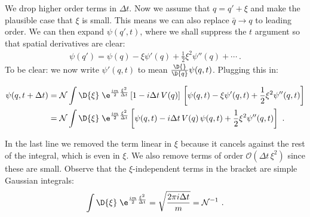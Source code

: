 We drop higher order terms in $\Delta t$.
Now we assume that $q= q' + \xi$ and make the plausible case that $\xi$ is small. This means we can also replace $\bar q \to q$ to leading order.
We can then expand $\psi(q',t)$, where we shall suppress the $t$ argument so that spatial derivatives are clear:
\begin{align}
    \psi(q') = \psi(q) -\xi \psi'(q) + \frac{1}{2}\xi^2 \psi''(q) + \cdots \ .
\end{align}
To be clear: we now write $\psi'(q,t)$ to mean $\frac{\D{}}{\D{q}}\psi(q,t)$.
Plugging this in:
\begin{wide}
\begin{align}
    \psi(q,t+\Delta t) &= 
    \mathcal N\int \D{\xi}\; 
    \e^{\frac{im}{2}\frac{\xi^2}{\Delta t}} 
    \left[1 - i\Delta t \, V(q)\right]\,
    \left[\psi(q,t) -\xi \psi'(q,t) + \frac{1}{2}\xi^2 \psi''(q,t)\right] 
    \\
    &= 
    \mathcal N\int \D{\xi}\; 
    \e^{\frac{im}{2}\frac{\xi^2}{\Delta t}} 
    \left[\psi(q,t) - i\Delta t \, V(q)\,\psi(q,t)
    + \frac{1}{2}\xi^2 \psi''(q,t)
    \right]
    \ .
 \label{eq:psi:path:integral:schrodinger:intermediate}
\end{align}
\end{wide}
In the last line we removed the term linear in $\xi$ because it cancels against the rest of the integral, which is even in $\xi$. We also remove terms of order $\mathcal O(\Delta t\,\xi^2)$ since these are small. Observe that the $\xi$-independent terms in the bracket are simple Gaussian integrals:
\begin{align}
    \int \D{\xi}\; 
    \e^{\frac{im}{2}\frac{\xi^2}{\Delta t}} 
    = 
    \sqrt{\frac{2\pi i\Delta t}{m}} = \mathcal{N}^{-1} \ .
    \label{eq:path:integral:Gaussian:trick:1}
\end{align}
